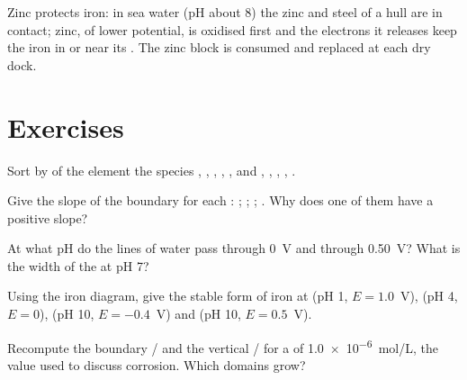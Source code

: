Zinc protects iron: in sea water (pH about 8) the zinc and steel of a
hull are in contact; zinc, of lower potential, is oxidised first and
the electrons it releases keep the iron in or near its .
The zinc block is consumed and replaced at each dry dock.

\section{Exercises}

\begin{exercise}[$\star$]\label{exo:b1:e-ph-diagrams:1}
Sort by  of the element the species , ,
, , , and , , ,
, .
\end{exercise}

\begin{exercise}[$\star$]\label{exo:b1:e-ph-diagrams:2}
Give the slope of the boundary for each :
; ;
; .
Why does one of them have a positive slope?
\end{exercise}

\begin{exercise}[$\star$]\label{exo:b1:e-ph-diagrams:3}
At what pH do the lines of water pass through 0~V and through
\qty{0.50}{V}? What is the width of the  at
pH 7?
\end{exercise}

\begin{exercise}[$\star$]\label{exo:b1:e-ph-diagrams:4}
Using the iron diagram, give the stable form of iron at
(pH 1, $E = 1.0$~V), (pH 4, $E = 0$), (pH 10, $E = -0.4$~V) and
(pH 10, $E = 0.5$~V).
\end{exercise}

\begin{exercise}[$\star\star$]\label{exo:b1:e-ph-diagrams:5}
Recompute the boundary / and the vertical
/ for a  of
\qty{1.0e-6}{mol/L}, the value used to discuss corrosion. Which domains
grow?
\end{exercise}

